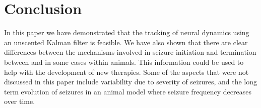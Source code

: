 \section{Conclusion}

In this paper we have demonstrated that the tracking of neural dynamics using an unscented Kalman filter is feasible. We have also shown that there are clear differences between the mechanisms involved in seizure initiation and termination between and in some cases within animals. This information could be used to help with the development of new therapies. Some of the aspects that were not discussed in this paper include variability due to severity of seizures, and the long term evolution of seizures in an animal model where seizure frequency decreases over time. 